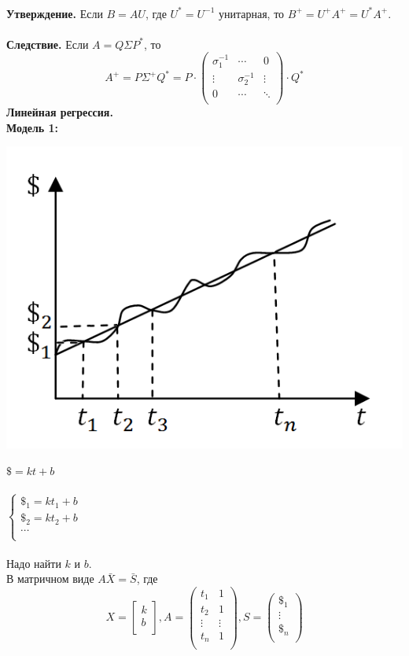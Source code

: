 \documentclass[12pt]{article}
\theoremstyle{definition}
\numberwithin{equation}{section}
\begin{document}
\\
\textbf{Утверждение.}
Если $B=AU$, где $U^*=U^{-1}$ унитарная, то $B^+=U^+A^+=U^*A^+$.\\ \\
\textbf{Следствие.}
Если $A=Q\Sigma P^*$, то \[A^+=P\Sigma^+Q^*=P \cdot \begin{pmatrix}
\sigma_1^{-1} & \cdots & 0 \\         
\vdots & \sigma_2^{-1} & \vdots \\
0 & \cdots & \ddots \\
\end{pmatrix} \cdot Q^*\]
\textbf{Линейная регрессия.}\\
\textbf{Модель 1:}\begin{center}
\includegraphics[scale=0.7]{l2_2.png}\end{center}
$\$ = kt+b$\\ \\
$
\left\{  
\begin{array}{ccl}  
    \$_1=kt_1+b\\
    \$_2=kt_2+b\\
    \cdots\\
\end{array}   
\right.  
$\\ \\
Надо найти $k$ и $b$.\\
В матричном виде $A\bar X=\bar S$, где\\
\[X = \begin{bmatrix}
k\\         
b\\
\end{bmatrix}, A = \begin{pmatrix}
t_1 & 1\\         
t_2 & 1\\
\vdots & \vdots\\
t_n & 1\\
\end{pmatrix}, S = \begin{pmatrix}
\$_1\\         
\vdots\\
\$_n\\
\end{pmatrix}\]\\
\end{document}
